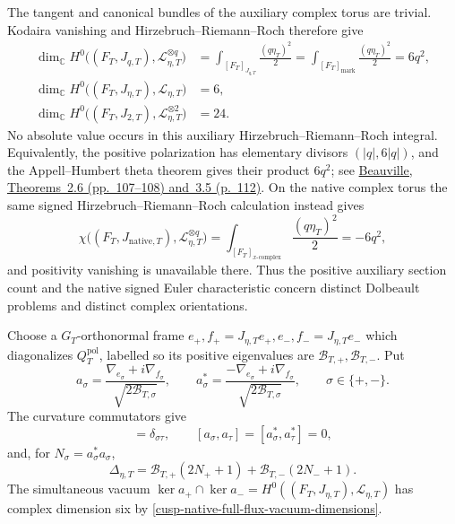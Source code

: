 The tangent and canonical bundles of the auxiliary complex torus are trivial.
Kodaira vanishing and Hirzebruch--Riemann--Roch therefore give
\begin{equation}
 \begin{aligned}
 \dim_{\mathbb C}H^0\bigl((F_T,J_{q,T}),
                   \mathscr L_{\eta,T}^{\otimes q}\bigr)
 &=\int_{[F_T]_{J_{q,T}}}\frac{(q\eta_T)^2}{2}
  =\int_{[F_T]_{\mathrm{mark}}}\frac{(q\eta_T)^2}{2}
  =6q^2,\\
 \dim_{\mathbb C}H^0\bigl((F_T,J_{\eta,T}),\mathscr L_{\eta,T}\bigr)
 &=6,\\
 \dim_{\mathbb C}H^0\bigl((F_T,J_{2,T}),
                   \mathscr L_{\eta,T}^{\otimes2}\bigr)
 &=24.
 \end{aligned}
 \label{cusp-native-full-flux-vacuum-dimensions}
\end{equation}
No absolute value occurs in this auxiliary Hirzebruch--Riemann--Roch integral.
Equivalently, the positive polarization has elementary divisors
\((|q|,6|q|)\), and the Appell--Humbert theta theorem gives their product
\(6q^2\); see
\href{https://math.univ-cotedazur.fr/~beauvill/pubs/thetaon.pdf}%
{Beauville, Theorems~2.6 (pp.~107--108) and~3.5 (p.~112)}.
On the native complex torus the same signed Hirzebruch--Riemann--Roch
calculation instead gives
\begin{equation}
 \chi\bigl((F_T,J_{\mathrm{native},T}),
           \mathscr L_{\eta,T}^{\otimes q}\bigr)
 =\int_{[F_T]_{x\text{-}\mathrm{complex}}}
       \frac{(q\eta_T)^2}{2}
 =-6q^2,
 \label{cusp-native-full-flux-native-signed-hrr}
\end{equation}
and positivity vanishing is unavailable there.  Thus the positive auxiliary
section count and the native signed Euler characteristic concern distinct
Dolbeault problems and distinct complex orientations.

Choose a \(G_T\)-orthonormal frame
\(e_+,f_+=J_{\eta,T}e_+,e_-,f_-=J_{\eta,T}e_-\) which diagonalizes
\(Q_T^{\mathrm{pol}}\), labelled so its positive eigenvalues are
\(\mathcal B_{T,+},\mathcal B_{T,-}\).  Put
\begin{equation}
 a_\sigma=
 \frac{\nabla_{e_\sigma}+i\nabla_{f_\sigma}}
      {\sqrt{2\mathcal B_{T,\sigma}}},
 \qquad
 a_\sigma^*=
 \frac{-\nabla_{e_\sigma}+i\nabla_{f_\sigma}}
      {\sqrt{2\mathcal B_{T,\sigma}}},
 \qquad \sigma\in\{+,-\}.
 \label{cusp-native-full-flux-ladders}
\end{equation}
The curvature commutators give
\begin{equation}
 [a_\sigma,a_\tau^*]=\delta_{\sigma\tau},
 \qquad [a_\sigma,a_\tau]=[a_\sigma^*,a_\tau^*]=0,
 \label{cusp-native-full-flux-CCR}
\end{equation}
and, for \(N_\sigma=a_\sigma^*a_\sigma\),
\begin{equation}
 \Delta_{\eta,T}
 =\mathcal B_{T,+}(2N_++1)+\mathcal B_{T,-}(2N_-+1).
 \label{cusp-native-full-flux-number-operator}
\end{equation}
The simultaneous vacuum
\(\ker a_+\cap\ker a_-=H^0((F_T,J_{\eta,T}),\mathscr L_{\eta,T})\)
has complex dimension six by
\cref{cusp-native-full-flux-vacuum-dimensions}.

